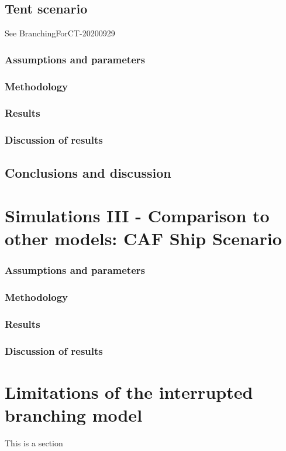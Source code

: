 \documentclass[sr]{drdc-report}
\begin{document}
\subsection{Tent scenario}
See BranchingForCT-20200929
\subsubsection{Assumptions and parameters}
\subsubsection{Methodology}
\subsubsection{Results}
\subsubsection{Discussion of results}


\subsection{Conclusions and discussion}

\section{Simulations III - Comparison to other models: CAF Ship Scenario}\label{Scenario_III_section_label}
\subsubsection{Assumptions and parameters}
\subsubsection{Methodology}
\subsubsection{Results}
\subsubsection{Discussion of results}

\section{Limitations of the interrupted branching model}\label{Limitations_section_label}
This is a section
\end{document}
